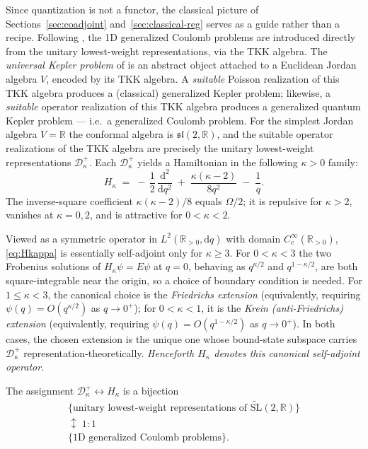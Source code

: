 \documentclass[11pt]{article}
\theoremstyle{plain}
\theoremstyle{definition}
\theoremstyle{remark}
\newcommand{\R}{\mathbb{R}}
\newcommand{\sltwo}{\mathfrak{sl}(2,\R)}
\newcommand{\SLt}{\widetilde{\mathrm{SL}}}
\newcommand{\D}{\mathcal{D}}
\begin{document}
Since quantization is not a functor, the classical picture of
Sections~\ref{sec:coadjoint} and~\ref{sec:classical-reg} serves as a guide rather than a recipe.  Following
\cite{Meng2014}, the 1D generalized Coulomb problems are introduced
directly from the unitary lowest-weight representations, via the TKK algebra.
The \emph{universal Kepler problem} of \cite{Meng2014} is an abstract
object attached to a Euclidean Jordan algebra $V$, encoded by its
TKK algebra. A \emph{suitable} Poisson realization
of this TKK algebra produces a (classical) generalized Kepler problem;
likewise, a \emph{suitable} operator realization of this TKK algebra
produces a generalized quantum Kepler problem --- i.e.\ a generalized
Coulomb problem. For the simplest Jordan algebra $V=\R$ the conformal algebra is
$\sltwo$, and the suitable operator realizations of the
TKK algebra are precisely the unitary lowest-weight
representations $\D^{+}_{\kappa}$. Each $\D^{+}_{\kappa}$ yields a
Hamiltonian in the following $\kappa>0$ family:
\begin{equation}\label{eq:Hkappa}
  \boxed{\;
    H_{\kappa}\;=\;-\,\frac12\,\frac{\mathrm{d}^{2}}{\mathrm{d}q^{2}}\;+\;\frac{\kappa(\kappa-2)}{8q^{2}}\;-\;\frac{1}{q}.
  \;}
\end{equation}
The inverse-square coefficient $\kappa(\kappa-2)/8$ equals $\Omega/2$; it is
repulsive for $\kappa>2$, vanishes at $\kappa=0,2$, and is
attractive for $0<\kappa<2$.

Viewed as a symmetric operator in $L^{2}(\R_{>0},\mathrm{d}q)$ with domain
$C_{c}^{\infty}(\R_{>0})$,
\eqref{eq:Hkappa} is essentially self-adjoint only for $\kappa\ge 3$.
For $0<\kappa<3$ the two Frobenius solutions of $H_{\kappa}\psi=E\psi$ at $q=0$, behaving as
$q^{\kappa/2}$ and $q^{1-\kappa/2}$, are both square-integrable near the
origin, so a choice of boundary condition is needed. For
$1\le\kappa<3$, the canonical choice is the \emph{Friedrichs extension}
(equivalently, requiring $\psi(q)=O(q^{\kappa/2})$ as $q\to 0^{+}$);
for $0<\kappa<1$, it is the \emph{Krein (anti-Friedrichs) extension}
(equivalently, requiring $\psi(q)=O(q^{1-\kappa/2})$ as $q\to 0^{+}$).
In both cases, the chosen extension is the unique one whose bound-state
subspace carries $\D^{+}_{\kappa}$ representation-theoretically. \emph{Henceforth $H_{\kappa}$ denotes this
canonical self-adjoint operator.}

The assignment $\D^{+}_{\kappa}\longleftrightarrow H_{\kappa}$ is a bijection
\begin{equation*}
  \boxed{\;\begin{gathered}
    \bigl\{\text{unitary lowest-weight representations of }\SLt(2,\R)\bigr\}\\
    \updownarrow\;{1{:}1}\\
    \bigl\{\text{1D generalized Coulomb problems}\bigr\}.
  \end{gathered}\;}
\end{equation*}
\end{document}
